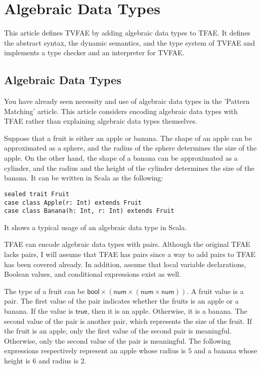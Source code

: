 \setchapterpreamble[u]{\margintoc}
\chapter{Algebraic Data Types}

This article defines TVFAE by adding algebraic data types to TFAE. It defines
the abstract syntax, the dynamic semantics, and the type system of TVFAE and
implements a type checker and an interpreter for TVFAE.

\section{Algebraic Data Types}

You have already seen necessity and use of algebraic data types in the 'Pattern
Matching' article. This article considers encoding algebraic data types with
TFAE rather than explaining algebraic data types themselves.

Suppose that a fruit is either an apple or banana. The shape of an apple can be
approximated as a sphere, and the radius of the sphere determines the size of
the apple. On the other hand, the shape of a banana can be approximated as a
cylinder, and the radius and the height of the cylinder determines the size of
the banana. It can be written in Scala as the following:

\begin{verbatim}
sealed trait Fruit
case class Apple(r: Int) extends Fruit
case class Banana(h: Int, r: Int) extends Fruit
\end{verbatim}

It shows a typical usage of an algebraic data type in Scala.

TFAE can encode algebraic data types with pairs. Although the original TFAE
lacks pairs, I will assume that TFAE has pairs since a way to add pairs to TFAE
has been covered already. In addition, assume that local variable declarations,
Boolean values, and conditional expressions exist as well.

The type of a fruit can be \(\textsf{bool}\times(\textsf{num}\times(\textsf{
num}\times\textsf{num}))\). A fruit value is a pair. The first value of the pair
indicates whether the fruits is an apple or a banana. If the value is \(\textsf{
true}\), then it is an apple. Otherwise, it is a banana. The second value of the
pair is another pair, which represents the size of the fruit. If the fruit is an
apple, only the first value of the second pair is meaningful. Otherwise, only
the second value of the pair is meaningful. The following expressions
respectively represent an apple whose radius is $5$ and a banana whose height
is $6$ and radius is $2$.

